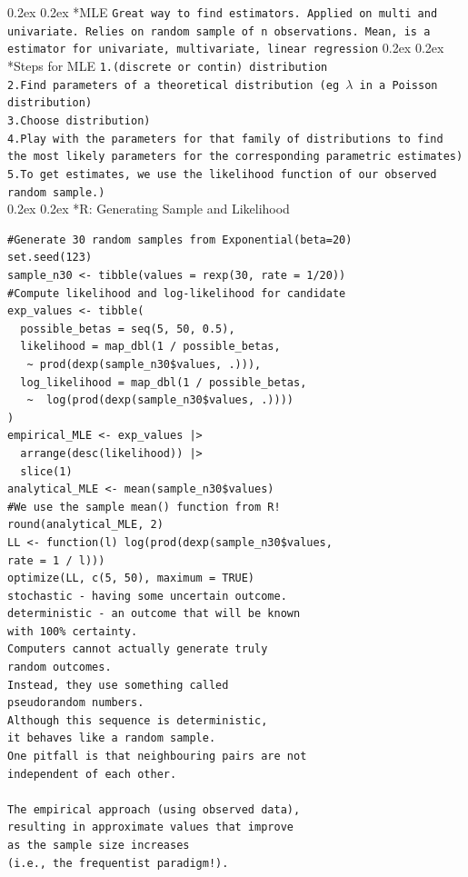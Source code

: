 \documentclass[8pt,landscape]{article}
\makeatletter
\renewcommand{\subsection}{\@startsection{subsection}{2}{0pt}%
    {0.2ex}%
    {0.2ex}%
    {\fontsize{8}{8}\bfseries}} %
\makeatother
\begin{document}
\begin{multicols}{3}
\subsection*{MLE}
\texttt{Great way to find estimators. Applied on multi and univariate. Relies on random sample of n observations. Mean, is a estimator for univariate, multivariate, linear regression}
\subsection*{Steps for MLE}
\texttt{1.(discrete or contin) distribution} \\
\texttt{2.Find parameters of a theoretical distribution (eg $\lambda$ in a Poisson distribution)} \\
\texttt{3.Choose distribution)} \\
\texttt{4.Play with the parameters for that family of distributions to find the most likely parameters for the corresponding parametric estimates)} \\
\texttt{5.To get estimates, we use the likelihood function of our observed random sample.)} \\
\subsection*{R: Generating Sample and Likelihood}
\begin{verbatim}
#Generate 30 random samples from Exponential(beta=20)
set.seed(123)
sample_n30 <- tibble(values = rexp(30, rate = 1/20))
#Compute likelihood and log-likelihood for candidate
exp_values <- tibble(
  possible_betas = seq(5, 50, 0.5),
  likelihood = map_dbl(1 / possible_betas, 
   ~ prod(dexp(sample_n30$values, .))),
  log_likelihood = map_dbl(1 / possible_betas, 
   ~  log(prod(dexp(sample_n30$values, .))))
)
empirical_MLE <- exp_values |>
  arrange(desc(likelihood)) |>
  slice(1)
analytical_MLE <- mean(sample_n30$values) 
#We use the sample mean() function from R!
round(analytical_MLE, 2)
LL <- function(l) log(prod(dexp(sample_n30$values,
rate = 1 / l)))
optimize(LL, c(5, 50), maximum = TRUE)
stochastic - having some uncertain outcome. 
deterministic - an outcome that will be known 
with 100% certainty.
Computers cannot actually generate truly 
random outcomes. 
Instead, they use something called 
pseudorandom numbers.
Although this sequence is deterministic, 
it behaves like a random sample. 
One pitfall is that neighbouring pairs are not 
independent of each other.

The empirical approach (using observed data),
resulting in approximate values that improve 
as the sample size increases 
(i.e., the frequentist paradigm!).


\end{verbatim}
\end{multicols}
\end{document}
